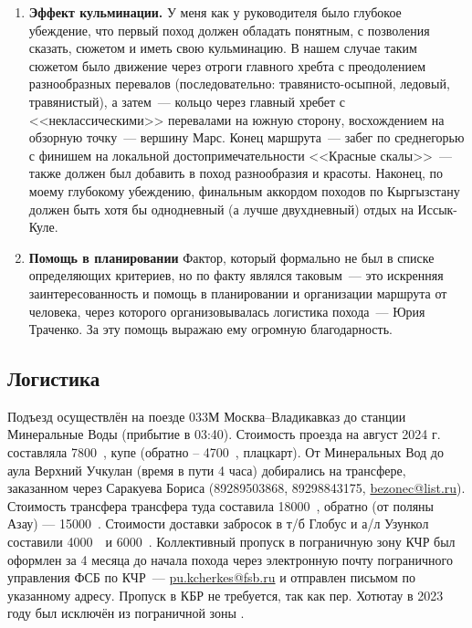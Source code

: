\begin{enumerate}
	\item \textbf{Эффект кульминации.}
	У меня как у руководителя было глубокое убеждение, что первый поход должен обладать понятным, с позволения сказать, сюжетом и иметь свою кульминацию. В нашем случае таким сюжетом было движение через отроги главного хребта с преодолением разнообразных перевалов (последовательно: травянисто-осыпной, ледовый, травянистый), а затем~--- кольцо через главный хребет с <<неклассическими>> перевалами на южную сторону, восхождением на обзорную точку~--- вершину Марс. Конец маршрута~--- забег по среднегорью с финишем на локальной достопримечательности <<Красные скалы>>~--- также должен был добавить в поход разнообразия и красоты. Наконец, по моему глубокому убеждению, финальным аккордом походов по Кыргызстану должен быть хотя бы  однодневный (а лучше двухдневный) отдых на Иссык-Куле.
	
	\item\textbf{Помощь в планировании}
	Фактор, который формально не был в списке определяющих критериев, но по факту являлся таковым~--- это искренняя заинтересованность и помощь в планировании и организации маршрута от человека, через которого организовывалась логистика похода~--- Юрия Траченко. За эту помощь выражаю ему огромную благодарность.
	
\end{enumerate} 
\subsection{Логистика}
Подъезд осуществлён на поезде 033М Москва--Владикавказ до станции Минеральные Воды (прибытие в 03:40). Стоимость проезда на август 2024 г. составляла 7800~\faRub, купе (обратно – 4700~\faRub, плацкарт). От Минеральных Вод до аула Верхний Учкулан (время в пути 4 часа) добирались на трансфере, заказанном через Саракуева Бориса (89289503868, 89298843175,  \href{mailto: bezonec@list.ru}{bezonec@list.ru}). Стоимость трансфера трансфера туда составила 18000~\faRub, обратно (от поляны Азау) — 15000~\faRub. Стоимости доставки забросок в т/б Глобус и а/л Узункол составили 4000~\faRub~и 6000~\faRub.
Коллективный пропуск в пограничную зону КЧР был оформлен за 4 месяца до начала похода через электронную почту пограничного управления ФСБ по КЧР~--- \href{mailto: pu.kcherkes@fsb.ru}{pu.kcherkes@fsb.ru} и отправлен письмом по указанному адресу. Пропуск в КБР не требуется, так как пер. Хотютау в 2023 году был исключён из пограничной зоны \cite{order_kbr}.
